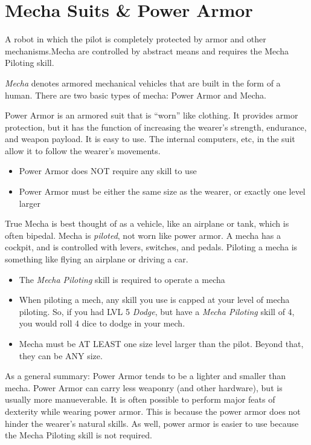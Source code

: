 \section{Mecha Suits \& Power Armor}
       
A robot in which the pilot is completely protected by armor and other mechanisms.Mecha are controlled by abstract means and requires the Mecha Piloting skill.

\emph{Mecha} denotes armored mechanical vehicles that are built in the form of a human. There are two basic types of mecha: Power Armor and Mecha.  

Power Armor is an armored suit that is ``worn'' like clothing.  It provides armor protection, but it has the function of increasing the wearer's strength, endurance, and weapon payload.  It is easy to use.  The internal computers, etc, in the suit allow it to follow the wearer's movements.

\begin{itemize}
\item Power Armor does NOT require any skill to use
\item Power Armor must be either the same size as the wearer, or exactly one level larger
\end{itemize}


True Mecha is best thought of as a vehicle, like an airplane or tank, which is often bipedal.  Mecha is \emph{piloted}, not worn like power armor.  A mecha has a cockpit, and is controlled with levers, switches, and pedals.  Piloting a mecha is something like flying an airplane or driving a car.

\begin{itemize}
\item The \emph{Mecha Piloting} skill is required to operate a mecha
\item When piloting a mech, any skill you use is capped at your level of mecha piloting.  So, if you had LVL 5 \emph{Dodge}, but have a \emph{Mecha Piloting} skill of 4, you would roll 4 dice to dodge in your mech.
\item Mecha must be AT LEAST one size level larger than the pilot.  Beyond that, they can be ANY size.
\end{itemize}

As a general summary: Power Armor tends to be a lighter and smaller than mecha.  Power Armor can carry less weaponry (and other hardware), but is usually more manueverable.  It is often possible to perform major feats of dexterity while wearing power armor.   This is because the power armor does not hinder the wearer's natural skills.  As well, power armor is easier to use because the Mecha Piloting skill is not required.

